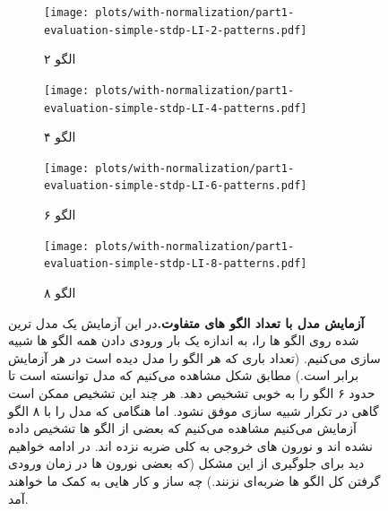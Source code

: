         
        \begin{figure}[!ht]
            \centering
            \begin{adjustbox}{minipage=\linewidth,scale=1}
                \begin{subfigure}[b]{0.45\textwidth}
                    \centering
                    \texttt{[image: plots/with-normalization/part1-evaluation-simple-stdp-LI-2-patterns.pdf]}
                    \caption{۲ الگو}
                    \label{fig:part1-evaluation-simple-stdp-LI-2-patterns}
                \end{subfigure}
                \hfill
                \begin{subfigure}[b]{0.45\textwidth}
                    \centering
                    \texttt{[image: plots/with-normalization/part1-evaluation-simple-stdp-LI-4-patterns.pdf]}
                    \caption{۴ الگو}
                    \label{fig:part1-evaluation-simple-stdp-LI-4-patterns}
                \end{subfigure}
                \vfill
                \begin{subfigure}[b]{0.45\textwidth}
                    \centering
                    \texttt{[image: plots/with-normalization/part1-evaluation-simple-stdp-LI-6-patterns.pdf]}
                    \caption{۶ الگو}
                    \label{fig:part1-evaluation-simple-stdp-LI-6-patterns}
                \end{subfigure}
                \hfill
                \begin{subfigure}[b]{0.45\textwidth}
                    \centering
                    \texttt{[image: plots/with-normalization/part1-evaluation-simple-stdp-LI-8-patterns.pdf]}
                    \caption{۸ الگو}
                    \label{fig:part1-evaluation-simple-stdp-LI-8-patterns}
                \end{subfigure}
            \end{adjustbox}
            \caption{\textbf{آزمایش مدل با تعداد الگو های متفاوت.}در این آزمایش یک مدل ترین شده روی الگو ها را، به اندازه یک بار ورودی دادن همه الگو ها شبیه سازی می‌کنیم. 
            (تعداد باری که هر الگو را مدل دیده است در هر آزمایش برابر است.) 
            مطابق شکل مشاهده می‌کنیم که مدل توانسته است تا حدود ۶ الگو را به خوبی تشخیص دهد. هر چند این تشخیص ممکن است گاهی در تکرار شبیه سازی موفق نشود. اما هنگامی که مدل را با ۸ الگو آزمایش می‌کنیم مشاهده می‌کنیم که بعضی از الگو ها تشخیص داده نشده اند و نورون های خروجی به کلی ضربه نزده اند. در ادامه خواهیم دید برای جلوگیری از این مشکل
            (که بعضی نورون ها در زمان ورودی گرفتن کل الگو ها ضربه‌ای نزنند.) 
            چه ساز و کار هایی به کمک ما خواهند آمد.}
            \label{fig:part1-evaluation-simple-stdp-LI}
        \end{figure}

